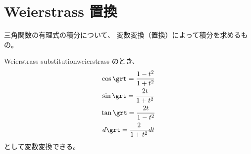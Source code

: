 \newpage
\section{Weierstrass 置換}
三角関数の有理式の積分について、
変数変換（置換）によって積分を求めるもの。
\begin{remark}{Weierstrass substitution}{weierstrass}
  のとき、
  \begin{gather}
    \cos \grt = \frac{1-t^2}{1+t^2} \\
    \sin \grt = \frac{2t}{1+t^2} \\
    \tan \grt = \frac{2t}{1-t^2} \\
    d\grt = \frac{2}{1+t^2}dt
  \end{gather}
  として変数変換できる。
\end{remark}
